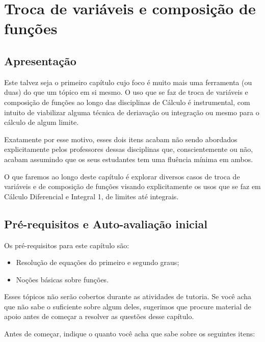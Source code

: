 \documentclass[main.tex]{subfiles}
\begin{document}
\paraAmbos

\chapter{Troca de variáveis e composição de funções}

\paraAlunos

\section{Apresentação}

Este talvez seja o primeiro capítulo cujo foco é muito mais uma ferramenta (ou duas) do que um tópico em si mesmo. O uso que se faz de troca de variáveis e composição de funções ao longo das disciplinas de Cálculo é instrumental, com intuito de viabilizar alguma técnica de deriavação ou integração ou mesmo para o cálculo de algum limite.

Exatamente por esse motivo, esses dois itens acabam não sendo abordados explicitamente pelos professores dessas disciplinas que, conscientemente ou não, acabam assumindo que os seus estudantes tem uma fluência mínima em ambos.

O que faremos ao longo deste capítulo é explorar diversos casos de troca de variáveis e de composição de funções visando explicitamente os usos que se faz em Cálculo Diferencial e Integral 1, de limites até integrais.

\section{Pré-requisitos e Auto-avaliação inicial}

Os pré-requisitos para este capítulo são:
\begin{itemize}
 \item Resolução de equações do primeiro e segundo graus;
 \item Noções básicas sobre funções.
\end{itemize}

Esses tópicos não serão cobertos durante as atividades de tutoria. Se você acha que não sabe o suficiente sobre algum deles, sugerimos que procure material de apoio antes de começar a resolver as questões desse capítulo.

Antes de começar, indique o quanto você acha que sabe sobre os seguintes itens:
\end{document}
